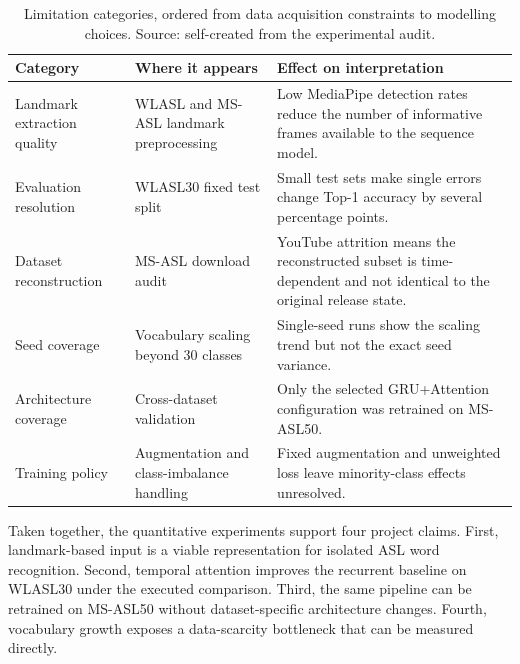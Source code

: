 \begin{table}[!htbp]
    \centering
    \footnotesize
    \renewcommand{\arraystretch}{1.15}
    \caption{Limitation categories, ordered from data acquisition constraints to modelling choices. Source: self-created from the experimental audit.}
    \label{tab:exp_limitation_categories}
    \begin{tabularx}{\linewidth}{@{}>{\RaggedRight\arraybackslash}p{3.1cm} >{\RaggedRight\arraybackslash}X >{\RaggedRight\arraybackslash}X@{}}
        \toprule
        \textbf{Category}           & \textbf{Where it appears}                 & \textbf{Effect on interpretation}                                                                                   \\
        \midrule
        Landmark extraction quality & WLASL and MS-ASL landmark preprocessing   & Low MediaPipe detection rates reduce the number of informative frames available to the sequence model.              \\
        Evaluation resolution       & WLASL30 fixed test split                  & Small test sets make single errors change Top-1 accuracy by several percentage points.                              \\
        Dataset reconstruction      & MS-ASL download audit                     & YouTube attrition means the reconstructed subset is time-dependent and not identical to the original release state. \\
        Seed coverage               & Vocabulary scaling beyond 30 classes      & Single-seed runs show the scaling trend but not the exact seed variance.                                            \\
        Architecture coverage       & Cross-dataset validation                  & Only the selected GRU+Attention configuration was retrained on MS-ASL50.                                            \\
        Training policy             & Augmentation and class-imbalance handling & Fixed augmentation and unweighted loss leave minority-class effects unresolved.                                     \\
        \bottomrule
    \end{tabularx}
\end{table}

Taken together, the quantitative experiments support four project claims. First, landmark-based
input is a viable representation for isolated ASL word recognition. Second, temporal attention
improves the recurrent baseline on WLASL30 under the executed comparison. Third, the same pipeline
can be retrained on MS-ASL50 without dataset-specific architecture changes. Fourth, vocabulary
growth exposes a data-scarcity bottleneck that can be measured directly.

